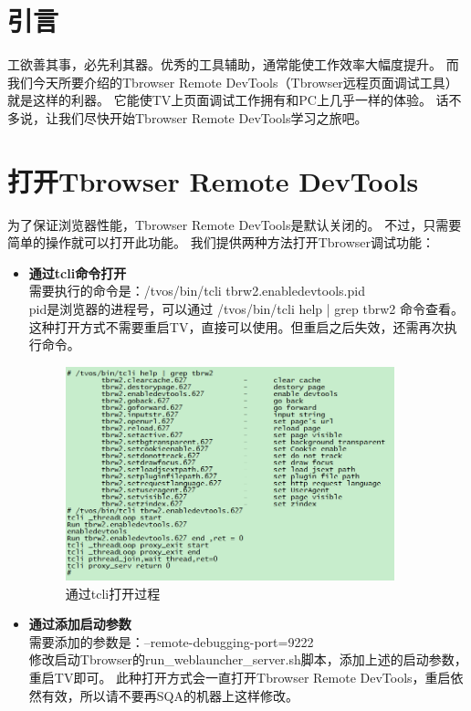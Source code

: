 \section{引言}
工欲善其事，必先利其器。优秀的工具辅助，通常能使工作效率大幅度提升。
而我们今天所要介绍的Tbrowser Remote DevTools（Tbrowser远程页面调试工具）就是这样的利器。
它能使TV上页面调试工作拥有和PC上几乎一样的体验。
话不多说，让我们尽快开始Tbrowser Remote DevTools学习之旅吧。

\section{打开Tbrowser Remote DevTools}
为了保证浏览器性能，Tbrowser Remote DevTools是默认关闭的。
不过，只需要简单的操作就可以打开此功能。
我们提供两种方法打开Tbrowser调试功能：

\begin{itemize}
  \item \textbf{通过tcli命令打开}\\
  需要执行的命令是：/tvos/bin/tcli tbrw2.enabledevtools.pid\\
  pid是浏览器的进程号，可以通过 /tvos/bin/tcli help | grep tbrw2 命令查看。\\
  这种打开方式不需要重启TV，直接可以使用。但重启之后失效，还需再次执行命令。
  \begin{figure}[H] 
  \centering 
  \includegraphics[width=0.9\textwidth]{image/devtools_study/tcli_command.PNG} 
  \caption{通过tcli打开过程} \label{fig:tcli_command} 
  \end{figure}
  
  \item \textbf{通过添加启动参数}\\
  需要添加的参数是：--remote-debugging-port=9222\\
  修改启动Tbrowser的run\_weblauncher\_server.sh脚本，添加上述的启动参数，重启TV即可。
  此种打开方式会一直打开Tbrowser Remote DevTools，重启依然有效，所以请不要再SQA的机器上这样修改。
\end{itemize}

